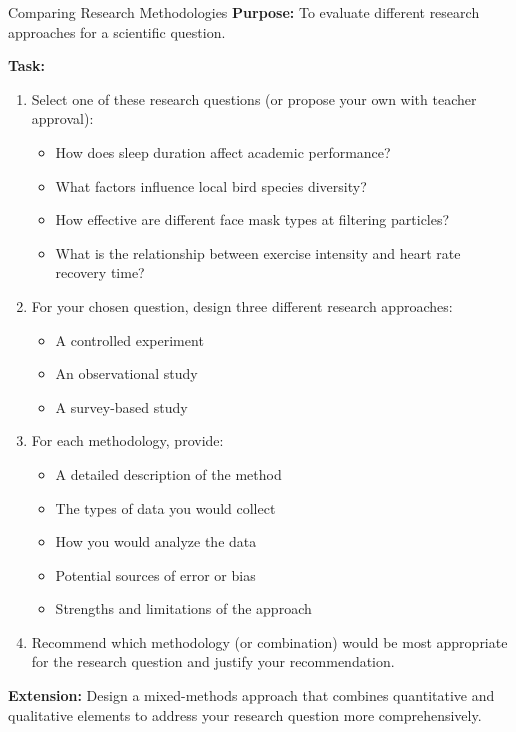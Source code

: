 
\begin{investigation}{Comparing Research Methodologies}
\textbf{Purpose:} To evaluate different research approaches for a scientific question.

\textbf{Task:}
\begin{enumerate}
    \item Select one of these research questions (or propose your own with teacher approval):
    \begin{itemize}
        \item How does sleep duration affect academic performance?
        \item What factors influence local bird species diversity?
        \item How effective are different face mask types at filtering particles?
        \item What is the relationship between exercise intensity and heart rate recovery time?
    \end{itemize}
    
    \item For your chosen question, design three different research approaches:
    \begin{itemize}
        \item A controlled experiment
        \item An observational study
        \item A survey-based study
    \end{itemize}
    
    \item For each methodology, provide:
    \begin{itemize}
        \item A detailed description of the method
        \item The types of data you would collect
        \item How you would analyze the data
        \item Potential sources of error or bias
        \item Strengths and limitations of the approach
    \end{itemize}
    
    \item Recommend which methodology (or combination) would be most appropriate for the research question and justify your recommendation.
\end{enumerate}

\textbf{Extension:} Design a mixed-methods approach that combines quantitative and qualitative elements to address your research question more comprehensively.
\end{investigation}

